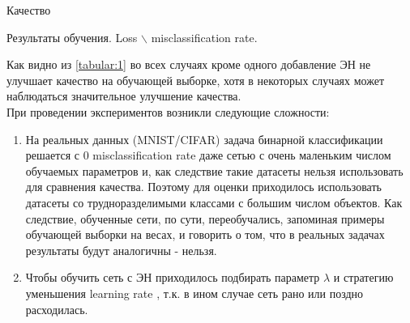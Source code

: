\documentclass[a4paper,12pt,titlepage,finall]{article}
\begin{document}
\begin{section}{Качество}
\begin{table}[H]
\begin{center}
		\caption{\label{tabular:1} Результаты обучения. Loss $\backslash$ misclassification rate.}
	\end{center}
\end{table}
	Как видно из \ref{tabular:1} во всех случаях кроме одного добавление ЭН не улучшает качество на обучающей выборке, хотя в некоторых случаях может наблюдаться значительное улучшение качества.\\
	При проведении экспериментов возникли следующие сложности:
	\begin{enumerate}
		\item На реальных данных (MNIST/CIFAR) задача бинарной классификации решается с 0 misclassification rate даже сетью с очень маленьким числом обучаемых параметров и, как следствие такие датасеты нельзя использовать для сравнения качества. Поэтому для оценки приходилось использовать датасеты со трудноразделимыми классами с большим числом объектов. Как следствие, обученные сети, по сути, переобучались, запоминая примеры обучающей выборки на весах, и говорить о том, что в реальных задачах результаты будут аналогичны - нельзя.
		\item Чтобы обучить сеть с ЭН приходилось подбирать параметр $\lambda$ и стратегию уменьшения learning rate , т.к. в ином случае сеть рано или поздно расходилась.
	\end{enumerate}
\end{section}
\end{document}
